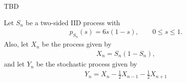 \ifspanish
TBD
\else

Let $S_n$ be a two-sided IID process with 	
\begin{align*}
p_{S_n}(s) = 6 s(1-s),    \qquad 0\le s\le 1.
\end{align*}
Also, let $X_n$ be the process given by
\begin{align*}
X_n = S_n (1-S_n),  
\end{align*}
and let $Y_n$ be the stochastic process given by 
\begin{align*}
Y_n = X_n - \frac12 X_{n-1} - \frac12 X_{n+1} 
\end{align*}


